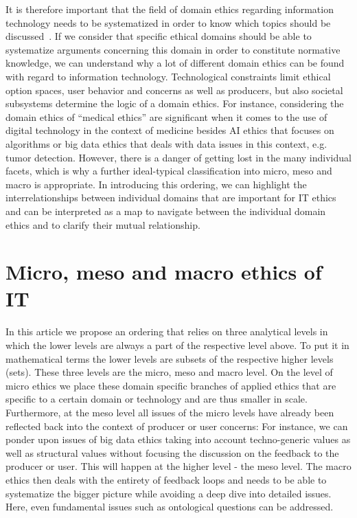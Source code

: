 \documentclass[manuscript,screen]{acmart}
\begin{document}
It is therefore important that the field of domain ethics regarding information technology needs to be systematized in order to know which topics should be discussed~\cite{Zuber2020}. If we consider that specific ethical domains should be able to systematize arguments concerning this domain in order to constitute normative knowledge, we can understand why a lot of different domain ethics can be found with regard to information technology. Technological constraints limit ethical option spaces, user behavior and concerns as well as producers, but also societal subsystems determine the logic of a domain ethics. For instance, considering the domain ethics of “medical ethics” are significant when it comes to the use of digital technology in the context of medicine besides AI ethics that focuses on algorithms or big data ethics that deals with data issues in this context, e.g. tumor detection. However, there is a danger of getting lost in the many individual facets, which is why a further ideal-typical classification into micro, meso and macro is appropriate. In introducing this ordering, we can highlight the interrelationships between individual domains that are important for IT ethics and can be interpreted as a map to navigate between the individual domain ethics and to clarify their mutual relationship. 

\section{Micro, meso and macro ethics of IT}
In this article we propose an ordering that relies on three analytical levels in which the lower levels are always a part of the respective level above. To put it in mathematical terms the lower levels are subsets of the respective higher levels (sets). These three levels are the micro, meso and macro level. On the level of micro ethics we place these domain specific branches of applied ethics that are specific to a certain domain or technology and are thus smaller in scale. Furthermore, at the meso level all issues of the micro levels have already been reflected back into the context of producer or user concerns: For instance, we can ponder upon issues of big data ethics taking into account techno-generic values as well as structural values without focusing the discussion on the feedback to the producer or user. This will happen at the higher level - the meso level. The macro ethics then deals with the entirety of feedback loops and needs to be able to systematize the bigger picture while avoiding a deep dive into detailed issues. Here, even fundamental issues such as ontological questions can be addressed. 
\end{document}
